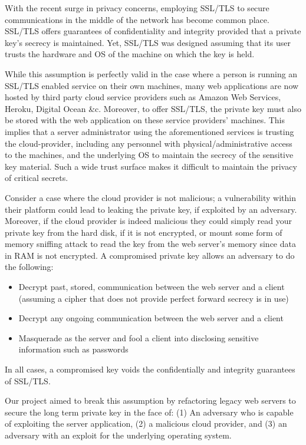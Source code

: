 \documentclass[../main.tex]{subfiles}
\begin{document}
With the recent surge in privacy concerns, employing SSL/TLS to secure communications in the middle of the network has become common place. 
SSL/TLS offers guarantees of confidentiality and integrity provided that a private key's secrecy is maintained. Yet, SSL/TLS was designed assuming that its user trusts the hardware and OS of the machine on which the key is held. 

While this assumption is perfectly valid in the case where a person is running an SSL/TLS enabled service on their own machines, many web
applications are now hosted by third party cloud service providers such as Amazon Web Services, Heroku, Digital Ocean \&c. Moreover, to offer SSL/TLS, the private key must also be stored with the web application on these service providers' machines. This implies that a server administrator using the aforementioned services is trusting the cloud-provider, including any personnel with physical/administrative access to the machines, and the underlying OS to maintain the secrecy of the sensitive key material. Such a wide trust surface makes it difficult to maintain the privacy of critical secrets.

Consider a case where the cloud provider is not malicious; a vulnerability within their platform could lead to leaking the private key,
if exploited by an adversary. Moreover, if the cloud provider is indeed malicious they could simply read your private key from the hard disk, if it is not encrypted, or mount some form of memory sniffing attack to read the key from the web server's memory since data in RAM is not encrypted. A compromised private key allows an adversary to do the following:
\begin{itemize}
	\item Decrypt past, stored, communication between the web server and a client (assuming a cipher that does not provide perfect forward secrecy is in use)
	\item Decrypt any ongoing communication between the web server and a client
	\item Masquerade as the server and fool a client into disclosing sensitive information such as passwords
\end{itemize}
In all cases, a compromised key voids the confidentially and integrity guarantees of SSL/TLS. 

Our project aimed to break this assumption by refactoring legacy web servers to secure the long term private key in the face of: (1) An adversary who is capable of exploiting the server application, (2) a malicious cloud provider, and (3) an adversary with an exploit for the underlying operating system. 
\end{document}
